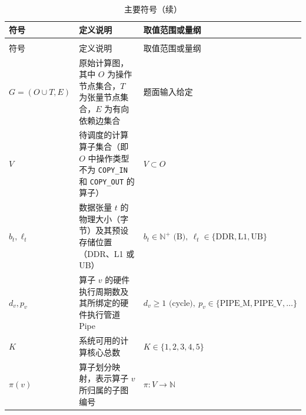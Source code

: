 \documentclass[anonymous,withtoc]{gmcm2026}
\begin{document}
{\def\LTcaptype{table} %
\begin{longtable}[]{@{}
  >{\raggedright\arraybackslash}p{}
  >{\raggedright\arraybackslash}p{}
  >{\raggedright\arraybackslash}p{}@{}}
\caption{主要符号}\label{tab:02-assumptions-1}\\
\toprule\noalign{}
\begin{minipage}[b]{\linewidth}\raggedright
符号
\end{minipage} & \begin{minipage}[b]{\linewidth}\raggedright
定义说明
\end{minipage} & \begin{minipage}[b]{\linewidth}\raggedright
取值范围或量纲
\end{minipage} \\
\midrule\noalign{}
\endfirsthead
\caption[]{主要符号（续）}\\
\toprule\noalign{}
\begin{minipage}[b]{\linewidth}\raggedright
符号
\end{minipage} & \begin{minipage}[b]{\linewidth}\raggedright
定义说明
\end{minipage} & \begin{minipage}[b]{\linewidth}\raggedright
取值范围或量纲
\end{minipage} \\
\midrule\noalign{}
\endhead
\bottomrule\noalign{}
\endlastfoot
\(G=(O\cup T, E)\) & 原始计算图，其中 \(O\) 为操作节点集合，\(T\) 为张量节点集合，\(E\) 为有向依赖边集合 & 题面输入给定 \\
\(V\) & 待调度的计算算子集合（即 \(O\) 中操作类型不为 \texttt{COPY\_IN} 和 \texttt{COPY\_OUT} 的算子） & \(V \subset O\) \\
\(b_t, \ell_t\) & 数据张量 \(t\) 的物理大小（字节）及其预设存储位置（DDR、L1 或 UB） & \(b_t \in \mathbb{N}^+ \text{ (B)},\ \ell_t \in \{\text{DDR}, \text{L1}, \text{UB}\}\) \\
\(d_v, p_v\) & 算子 \(v\) 的硬件执行周期数及其所绑定的硬件执行管道 Pipe & \(d_v \ge 1 \text{ (cycle)},\ p_v \in \{\text{PIPE\_M}, \text{PIPE\_V}, \dots\}\) \\
\(K\) & 系统可用的计算核心总数 & \(K \in \{1, 2, 3, 4, 5\}\) \\
\(\pi(v)\) & 算子划分映射，表示算子 \(v\) 所归属的子图编号 & \(\pi: V \to \mathbb{N}\) \\

\end{longtable}}
\end{document}
